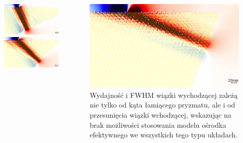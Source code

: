 \documentclass{beamer}
\begin{document}
\begin{frame}[t]
	\begin{columns}
		\begin{column}{0.5\textwidth}
			\begin{figure}
				\includegraphics[width=\textwidth]{../images/multilayer/prism04.png} \\
				\includegraphics[width=\textwidth]{../images/multilayer/prism08.png} \\
			\end{figure}
		\end{column}
		\begin{column}{0.5\textwidth}
				\includegraphics[width=\textwidth]{../images/multilayer/prism12.png}\\
				Wydajność i FWHM wiązki wychodzącej zależą nie tylko od kąta łamiącego pryzmatu, ale i od przesunięcia wiązki wchodzącej, wskazując na brak możliwości stosowania modelu ośrodka efektywnego we wszystkich tego typu układach.
		\end{column}
	\end{columns}
		
\end{frame}
\end{document}
